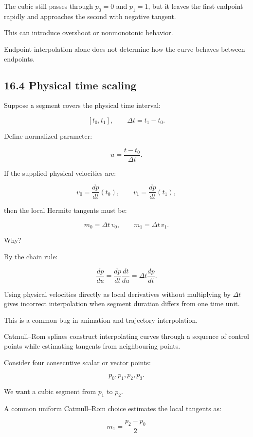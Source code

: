 The cubic still passes through \(p_0=0\) and \(p_1=1\), but it leaves the first endpoint rapidly and approaches the second with negative tangent.

This can introduce overshoot or nonmonotonic behavior.

Endpoint interpolation alone does not determine how the curve behaves between endpoints.

\subsection{16.4 Physical time scaling}\label{02-foundations-ii-ch028-physical-time-scaling}

\hypertarget{02-foundations-ii-ch028-physical-time-scaling}{}

Suppose a segment covers the physical time interval:

\[ [t_0,t_1], \qquad \Delta t=t_1-t_0. \]

Define normalized parameter:

\[ u=\frac{t-t_0}{\Delta t}. \]

If the supplied physical velocities are:

\[ v_0=\frac{dp}{dt}(t_0), \qquad v_1=\frac{dp}{dt}(t_1), \]

then the local Hermite tangents must be:

\[ \boxed{ m_0=\Delta t\,v_0, \qquad m_1=\Delta t\,v_1 }. \]

Why?

By the chain rule:

\[ \frac{dp}{du} = \frac{dp}{dt}\frac{dt}{du} = \Delta t\frac{dp}{dt}. \]

Using physical velocities directly as local derivatives without multiplying by \(\Delta t\) gives incorrect interpolation when segment duration differs from one time unit.

This is a common bug in animation and trajectory interpolation.

Catmull--Rom splines construct interpolating curves through a sequence of control points while estimating tangents from neighbouring points.

Consider four consecutive scalar or vector points:

\[ p_0,p_1,p_2,p_3. \]

We want a cubic segment from \(p_1\) to \(p_2\).

A common uniform Catmull--Rom choice estimates the local tangents as:

\[ \boxed{ m_1=\frac{p_2-p_0}{2} } \]


